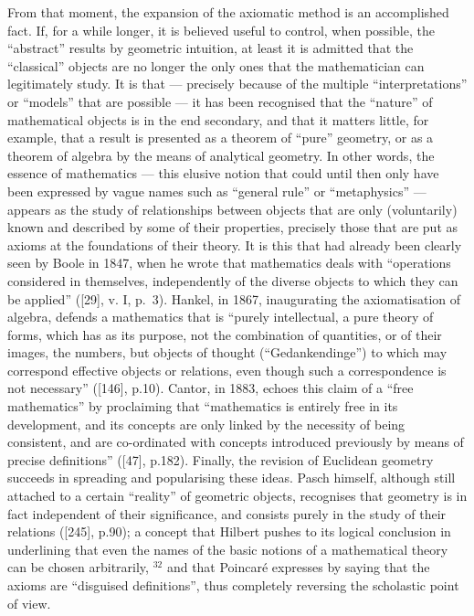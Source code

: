 From that moment, the expansion of the axiomatic method is an accomplished fact. If, for a while longer, it is believed useful to control, when possible, the ``abstract'' results by geometric intuition, at least it is admitted that the ``classical'' objects are no longer the only ones that the mathematician can legitimately study. It is that --- precisely because of the multiple ``interpretations'' or ``models'' that are possible --- it has been recognised that the ``nature'' of mathematical objects is in the end secondary, and that it matters little, for example, that a result is presented as a theorem of ``pure'' geometry, or as a theorem of algebra by the means of analytical geometry. In other words, the essence of mathematics --- this elusive notion that could until then only have been expressed by vague names such as ``general rule'' or ``metaphysics'' --- appears as the study of relationships between objects that are only (voluntarily) known and described by some of their properties, precisely those that are put as axioms at the foundations of their theory. It is this that had already been clearly seen by Boole in 1847, when he wrote that mathematics deals with ``operations considered in themselves, independently of the diverse objects to which they can be applied'' ({[}29{]}, v. I, p.~3). Hankel, in 1867, inaugurating the axiomatisation of algebra, defends a mathematics that is ``purely intellectual, a pure theory of forms, which has as its purpose, not the combination of quantities, or of their images, the numbers, but objects of thought (``Gedankendinge'') to which may correspond effective objects or relations, even though such a correspondence is not necessary'' ({[}146{]}, p.10). Cantor, in 1883, echoes this claim of a ``free mathematics'' by proclaiming that ``mathematics is entirely free in its development, and its concepts are only linked by the necessity of being consistent, and are co-ordinated with concepts introduced previously by means of precise definitions'' ({[}47{]}, p.182). Finally, the revision of Euclidean geometry succeeds in spreading and popularising these ideas. Pasch himself, although still attached to a certain ``reality'' of geometric objects, recognises that geometry is in fact independent of their significance, and consists purely in the study of their relations ({[}245{]}, p.90); a concept that Hilbert pushes to its logical conclusion in underlining that even the names of the basic notions of a mathematical theory can be chosen arbitrarily, \(^{32}\) and that Poincaré expresses by saying that the axioms are ``disguised definitions'', thus completely reversing the scholastic point of view.

